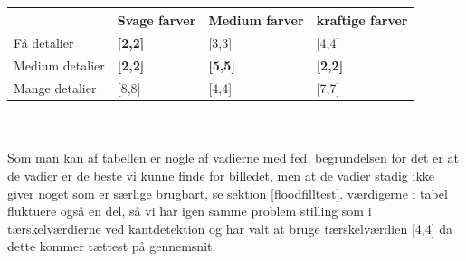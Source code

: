\begin{tabular}{| l | l | l | l |} \hline
  						& Svage farver 		& Medium farver & kraftige farver \\ \hline
	Få detalier 		& \textbf{[2,2]}	& [3,3]			& [4,4]\\ \hline
	Medium detalier 	& \textbf{[2,2]}	& \textbf{[5,5]}& \textbf{[2,2]}\\ \hline
	Mange detalier		& [8,8]				& [4,4]			& [7,7]\\ \hline
\end{tabular} \label{thressholdsTabelFF}\\\\

Som man kan af tabellen er nogle af vadierne med fed, begrundelsen for det er at de vadier er de beste vi kunne finde for billedet, men at de vadier stadig ikke giver noget som er særlige brugbart, se sektion \ref{floodfilltest}. værdigerne i tabel fluktuere også en del, så vi har igen samme problem stilling som i tærskelværdierne ved kantdetektion og har valt at bruge tærskelværdien [4,4] da dette kommer tættest på gennemsnit.
